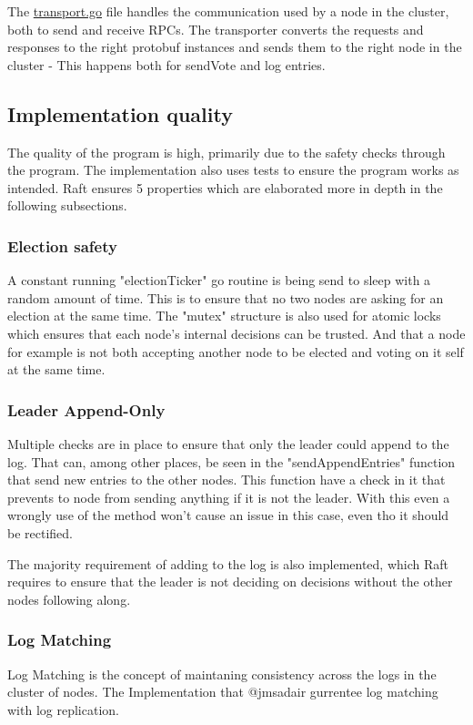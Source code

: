 \documentclass[a4paper,11pt]{article}
\begin{document}
The \href{https://github.com/jmsadair/raft/blob/dev/transport.go}{transport.go} file handles the communication used by a node in the cluster, both to send and receive RPCs. 
The transporter converts the requests and responses to the right protobuf instances and sends them to the right node in the cluster - This happens both for sendVote and log entries. 

\subsection*{Implementation quality}
The quality of the program is high, primarily due to the safety checks through the program. The implementation also uses tests to ensure the program works as intended.
Raft ensures 5 properties which are elaborated more in depth in the following subsections.

\subsubsection*{Election safety}
A constant running "electionTicker" go routine is being send to sleep with a random amount of time.
This is to ensure that no two nodes are asking for an election at the same time.
The "mutex" structure is also used for atomic locks which ensures that each node's internal decisions can be trusted.
And that a node for example is not both accepting another node to be elected and voting on it self at the same time.

\subsubsection*{Leader Append-Only}
Multiple checks are in place to ensure that only the leader could append to the log.
That can, among other places, be seen in the "sendAppendEntries" function that send new entries to the other nodes.
This function have a check in it that prevents to node from sending anything if it is not the leader.
With this even a wrongly use of the method won't cause an issue in this case, even tho it should be rectified.

The majority requirement of adding to the log is also implemented, 
which Raft requires to ensure that the leader is not deciding on decisions without the other nodes following along.

\subsubsection*{Log Matching}
Log Matching is the concept of maintaning consistency across the logs in the cluster of nodes. The Implementation that @jmsadair gurrentee log matching with log replication.
\end{document}
